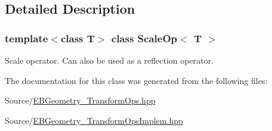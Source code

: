 \subsection{Detailed Description}
\subsubsection*{template$<$class T$>$\newline
class Scale\+Op$<$ T $>$}

Scale operator. Can also be used as a reflection operator. 

The documentation for this class was generated from the following files\+:\begin{DoxyCompactItemize}
\item 
Source/\hyperlink{EBGeometry__TransformOps_8hpp}{E\+B\+Geometry\+\_\+\+Transform\+Ops.\+hpp}\item 
Source/\hyperlink{EBGeometry__TransformOpsImplem_8hpp}{E\+B\+Geometry\+\_\+\+Transform\+Ops\+Implem.\+hpp}\end{DoxyCompactItemize}
